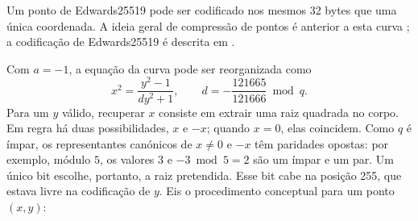 Um ponto de Edwards25519 pode ser codificado nos mesmos 32 bytes que uma única
coordenada. A ideia geral de compressão de pontos é anterior a esta curva
\cite{Miller:point-compression-origin}; a codificação de Edwards25519 é descrita
em \cite{Bernstein2012,eddsa-ed25519-irtf}.


Com \(a=-1\), a equação da curva pode ser reorganizada como
\[
x^2=\frac{y^2-1}{dy^2+1},
\qquad d=-\frac{121665}{121666}\bmod q.
\]
Para um \(y\) válido, recuperar \(x\) consiste em extrair uma raiz quadrada no
corpo. Em regra há duas possibilidades, \(x\) e \(-x\); quando \(x=0\), elas
coincidem. Como \(q\) é ímpar, os representantes canónicos de \(x\ne0\) e
\(-x\) têm paridades opostas: por exemplo, módulo \(5\), os valores \(3\) e
\(-3\bmod5=2\) são um ímpar e um par. Um único bit escolhe, portanto, a raiz
pretendida.
Esse bit cabe na posição 255, que estava livre na codificação de \(y\). Eis o
procedimento conceptual para um ponto \((x,y)\):




